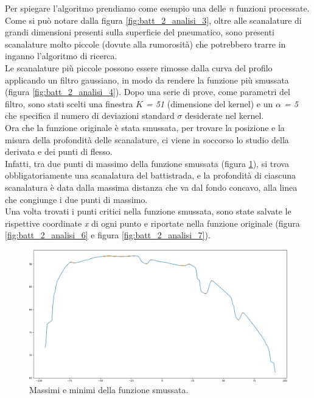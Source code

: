 \noindent Per spiegare l'algoritmo prendiamo come esempio una delle \textit{n} funzioni processate. Come si può notare dalla figura \ref{fig:batt_2_analisi_3}, oltre alle scanalature di grandi dimensioni presenti sulla superficie del pneumatico, sono presenti scanalature molto piccole (dovute alla rumorosità) che potrebbero trarre in inganno l'algoritmo di ricerca.\\
\newline
Le scanalature più piccole possono essere rimosse dalla curva del profilo applicando un filtro gaussiano, in modo da rendere la funzione  più smussata (figura \ref{fig:batt_2_analisi_4}). Dopo una serie di prove, come parametri del filtro, sono stati scelti una finestra \textit{$K$ = 51} (dimensione del kernel) e un \textit{$\alpha$ = 5} che specifica il numero di deviazioni standard $\sigma$ desiderate nel kernel.\\
\newline
Ora che la funzione originale è stata smussata, per trovare la posizione e la misura della profondità delle scanalature, ci viene in soccorso lo studio della derivata e dei punti di flesso.\\
\newline
Infatti, tra due punti di massimo della funzione smussata (figura \ref{fig:batt_2_analisi_5}), si trova obbligatoriamente una scanalatura del battistrada, e la profondità di ciascuna scanalatura è data dalla massima distanza che va dal fondo concavo, alla linea che congiunge i due punti di massimo.\\
\newline
Una volta trovati i punti critici nella funzione smussata, sono state salvate le rispettive coordinate \textit{x} di ogni punto e riportate nella funzione originale (figura \ref{fig:batt_2_analisi_6} e figura \ref{fig:batt_2_analisi_7}).\\

\begin{figure}[H]
	\centering
	\includegraphics[width=0.9\columnwidth]{./pictures/batt_2_analisi_5.png}
	\caption{Massimi e minimi della funzione smussata.}\label{fig:batt_2_analisi_5}
\end{figure}

